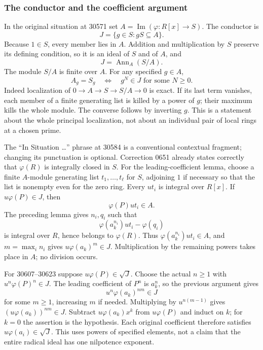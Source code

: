 \subsubsection{The conductor and the coefficient argument}\label{algebra-proof-032-the-conductor-and-the-coefficient-argument}

In the original situation at 30571 set \(A=\operatorname{Im}(\varphi:R[x]\to S)\). The conductor is \[
 J=\{g\in S:gS\subseteq A\}.
\] Because \(1\in S\), every member lies in \(A\). Addition and multiplication by \(S\) preserve its defining condition, so it is an ideal of \(S\) and of \(A\), and \[
 J=\operatorname{Ann}_A(S/A).
\] The module \(S/A\) is finite over \(A\). For any specified \(g\in A\), \[
 A_g=S_g\quad\Longleftrightarrow\quad
                  g^N\in J\text{ for some }N\geq0.
\] Indeed localization of \(0\to A\to S\to S/A\to0\) is exact. If its last term vanishes, each member of a finite generating list is killed by a power of \(g\); their maximum kills the whole module. The converse follows by inverting \(g\). This is a statement about the whole principal localization, not about an individual pair of local rings at a chosen prime.

The ``In Situation \ldots'' phrase at 30584 is a conventional contextual fragment; changing its punctuation is optional. Correction 0651 already states correctly that \(\varphi(R)\) is integrally closed in \(S\). For the leading-coefficient lemma, choose a finite \(A\)-module generating list \(t_1,\ldots,t_\ell\) for \(S\), adjoining \(1\) if necessary so that the list is nonempty even for the zero ring. Every \(ut_i\) is integral over \(R[x]\). If \(u\varphi(P)\in J\), then \[
 \varphi(P)ut_i\in A.
\] The preceding lemma gives \(n_i,q_i\) such that \[
 \varphi(a_k^{n_i})ut_i-\varphi(q_i)
\] is integral over \(R\), hence belongs to \(\varphi(R)\). Thus \(\varphi(a_k^{n_i})ut_i\in A\), and \(m=\max_i n_i\) gives \(u\varphi(a_k)^m\in J\). Multiplication by the remaining powers takes place in \(A\); no division occurs.

For 30607--30623 suppose \(u\varphi(P)\in\sqrt J\). Choose the actual \(n\geq1\) with \(u^n\varphi(P)^n\in J\). The leading coefficient of \(P^n\) is \(a_k^n\), so the previous argument gives \[
 u^n\varphi(a_k)^{nm}\in J
\] for some \(m\geq1\), increasing \(m\) if needed. Multiplying by \(u^{n(m-1)}\) gives \((u\varphi(a_k))^{nm}\in J\). Subtract \(u\varphi(a_k)x^k\) from \(u\varphi(P)\) and induct on \(k\); for \(k=0\) the assertion is the hypothesis. Each original coefficient therefore satisfies \(u\varphi(a_i)\in\sqrt J\). This uses powers of specified elements, not a claim that the entire radical ideal has one nilpotence exponent.

